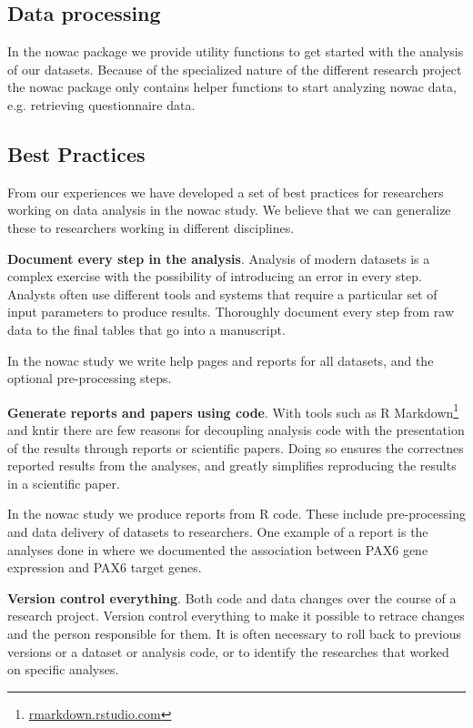 \subsection{Data processing} 
In the \gls{nowac} package we provide utility functions to get started with the
analysis of our datasets. Because of the specialized nature of the different
research project the \gls{nowac} package only contains helper functions to start
analyzing \gls{nowac} data, e.g. retrieving questionnaire data. 

\subsection{Best Practices} 
From our experiences we have developed a set of best practices for researchers
working on data analysis in the \gls{nowac} study. We believe that we can
generalize these to researchers working in different disciplines. 

\textbf{Document every step in the analysis}. Analysis of modern datasets is a
complex exercise with the possibility of introducing an error in every step.
Analysts often use different tools and systems that require a particular set of
input parameters to produce results. Thoroughly document every step from raw
data to the final tables that go into a manuscript.

In the \gls{nowac} study we write help pages and reports for all datasets, and
the optional pre-processing steps. 

\textbf{Generate reports and papers using code}. With tools such as R
Markdown\footnote{\url{rmarkdown.rstudio.com}}
and kntir there are few reasons for decoupling analysis code with the
presentation of the results through reports or scientific papers. Doing so
ensures the correctnes reported results from the analyses, and greatly
simplifies reproducing the results in a scientific paper. 

In the \gls{nowac} study we produce reports from R code. These include
pre-processing and data delivery of datasets to researchers. One example of a
report is the analyses done in \cite{kiselev2018transcription} where we
documented the association between PAX6 gene expression and PAX6 target genes.

\textbf{Version control everything}. Both code and data changes over the course
of a research project. Version control everything to make it possible to retrace
changes and the person responsible for them. It is often necessary to roll back
to previous versions or a dataset or analysis code, or to identify the
researches that worked on specific analyses. 

